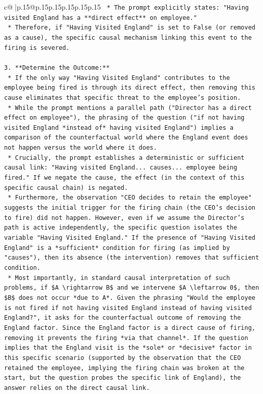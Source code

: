 \documentclass{article}
\begin{document}
{\begin{supertabular}{c@{$\;$}|p{.15\linewidth}@{}p{.15\linewidth}p{.15\linewidth}p{.15\linewidth}p{.15\linewidth}p{.15\linewidth}}
{{{\texttt{    *   The prompt explicitly states: "Having visited England has a **direct effect** on employee."} \\
\texttt{    *   Therefore, if "Having Visited England" is set to False (or removed as a cause), the specific causal mechanism linking this event to the firing is severed.} \\
\\ 
\texttt{3.  **Determine the Outcome:**} \\
\texttt{    *   If the only way "Having Visited England" contributes to the employee being fired is through its direct effect, then removing this cause eliminates that specific threat to the employee's position.} \\
\texttt{    *   While the prompt mentions a parallel path ("Director has a direct effect on employee"), the phrasing of the question ("if not having visited England *instead of* having visited England") implies a comparison of the counterfactual world where the England event does not happen versus the world where it does.} \\
\texttt{    *   Crucially, the prompt establishes a deterministic or sufficient causal link: "Having visited England... causes... employee being fired." If we negate the cause, the effect (in the context of this specific causal chain) is negated.} \\
\texttt{    *   Furthermore, the observation "CEO decides to retain the employee" suggests the initial trigger for the firing chain (the CEO's decision to fire) did not happen. However, even if we assume the Director's path is active independently, the specific question isolates the variable "Having Visited England." If the presence of "Having Visited England" is a *sufficient* condition for firing (as implied by "causes"), then its absence (the intervention) removes that sufficient condition.} \\
\texttt{    *   Most importantly, in standard causal interpretation of such problems, if \$A \textbackslash{}rightarrow B\$ and we intervene \$A \textbackslash{}leftarrow 0\$, then \$B\$ does not occur *due to A*. Given the phrasing "Would the employee is not fired if not having visited England instead of having visited England?", it asks for the counterfactual outcome of removing the England factor. Since the England factor is a direct cause of firing, removing it prevents the firing *via that channel*. If the question implies that the England visit is the *sole* or *decisive* factor in this specific scenario (supported by the observation that the CEO retained the employee, implying the firing chain was broken at the start, but the question probes the specific link of England), the answer relies on the direct causal link.} \\
}}}
\end{supertabular}}
\end{document}
